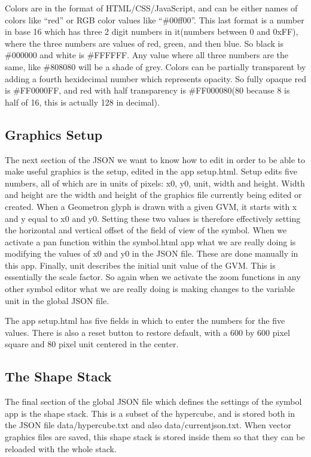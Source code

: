 Colors are in the format of HTML/CSS/JavaScript, and can be either names of colors like ``red'' or RGB color values like ``\#00ff00''.  This last format is a number in base 16 which has three 2 digit numbers in it(numbers between 0 and 0xFF), where the three numbers are values of red, green, and then blue.  So black is \#000000 and white is \#FFFFFF.  Any value where all three numbers are the same, like \#808080 will be a shade of grey.   Colors can be partially transparent by adding a fourth hexidecimal number which represents opacity.  So fully opaque red is \#FF0000FF, and red with half transparency is #FF000080(80 because 8 is half of 16, this is actually 128 in decimal).

\subsection{Graphics Setup}

The next section of the JSON we want to know how to edit in order to be able to make useful graphics is the setup, edited in the app setup.html.  Setup edits five numbers, all of which are in units of pixels: x0, y0, unit, width and height.  Width and height are the width and height of the graphics file currently being edited or created.  When a Geometron glyph is drawn with a given GVM, it starts with x and y equal to x0 and y0. Setting these two values is therefore effectively setting the horizontal and vertical offset of the field of view of the symbol.  When we activate a pan function within the symbol.html app what we are really doing is modifying the values of x0 and y0 in the JSON file.  These are done manually in this app.  Finally, unit describes the initial unit value of the GVM.  This is essentially the scale factor.  So again when we activate the zoom functions in any other symbol editor what we are really doing is making changes to the variable unit in the global JSON file.    

The app setup.html has five fields in which to enter the numbers for the five values. There is also a reset button to restore default, with a 600 by 600 pixel square and 80 pixel unit centered in the center.  

\subsection{The Shape Stack}

The final section of the global JSON file which defines the settings of the symbol app is the shape stack.  This is a subset of the hypercube, and is stored both in the JSON file data/hypercube.txt and also data/currentjson.txt.  When vector graphics files are saved, this shape stack is stored inside them so that they can be reloaded with the whole stack.


